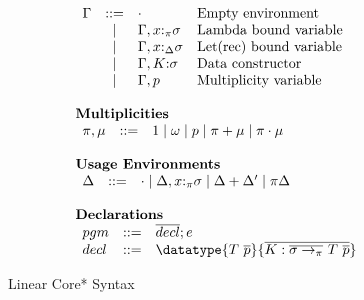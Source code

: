 \begin{figure}[h]
\begin{framed}
\[\begin{array}{l}
\begin{array}{lcll}
  \Gamma & ::= & \cdot & \textrm{Empty environment} \\
         & \mid & \Gamma,x{:}_\pi\sigma & \textrm{Lambda bound variable} \\
         & \mid & \Gamma,x{:}_\Delta\sigma & \textrm{Let(rec) bound variable}\\
         & \mid & \Gamma,K{:}\sigma & \textrm{Data constructor}\\
         & \mid & \Gamma,p & \textrm{Multiplicity variable}\\
\end{array}\\\\
%
\textbf{Multiplicities}\\
\begin{array}{lcll}
  \pi, \mu & ::= & 1 \mid \omega \mid p \mid \pi + \mu \mid \pi \cdot \mu\\
\end{array}\\\\
%
\textbf{Usage Environments}\\
\begin{array}{lcl}
  \Delta & ::= & \cdot \mid \Delta, x{:}_\pi\sigma \mid \Delta+\Delta' \mid \pi\Delta\\
\end{array}\\\\
%
\textbf{Declarations}\\
\begin{array}{lcl}
  pgm & ::= & \overline{decl}; e \\
  decl & ::= & \datatype{T~\overline{p}}{\overline{K:\overline{\sigma \to_\pi}~T~\overline{p}}}
\end{array}
%
\end{array}
\]
\end{framed}
\caption{Linear Core* Syntax}
\label{linear-core-syntax}
\end{figure}

